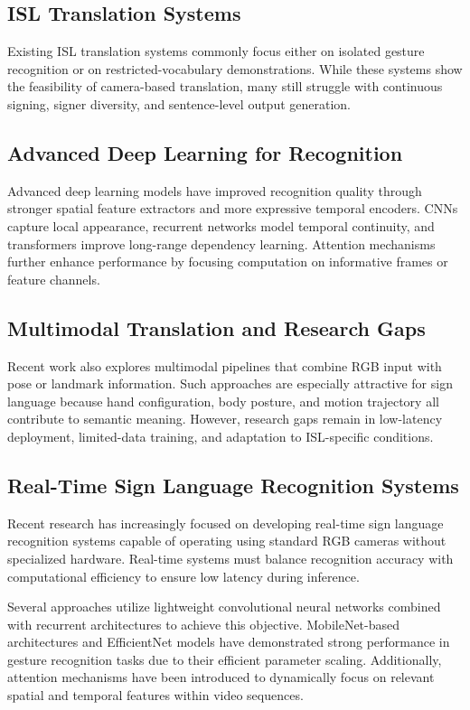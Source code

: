 \documentclass[runningheads]{llncs}
\begin{document}
\subsection{ISL Translation Systems}
Existing ISL translation systems commonly focus either on isolated gesture recognition or on restricted-vocabulary demonstrations. While these systems show the feasibility of camera-based translation, many still struggle with continuous signing, signer diversity, and sentence-level output generation.

\subsection{Advanced Deep Learning for Recognition}
Advanced deep learning models have improved recognition quality through stronger spatial feature extractors and more expressive temporal encoders. CNNs capture local appearance, recurrent networks model temporal continuity, and transformers improve long-range dependency learning. Attention mechanisms further enhance performance by focusing computation on informative frames or feature channels.

\subsection{Multimodal Translation and Research Gaps}
Recent work also explores multimodal pipelines that combine RGB input with pose or landmark information. Such approaches are especially attractive for sign language because hand configuration, body posture, and motion trajectory all contribute to semantic meaning. However, research gaps remain in low-latency deployment, limited-data training, and adaptation to ISL-specific conditions.

\subsection{Real-Time Sign Language Recognition Systems}
Recent research has increasingly focused on developing real-time sign language recognition systems capable of operating using standard RGB cameras without specialized hardware. Real-time systems must balance recognition accuracy with computational efficiency to ensure low latency during inference.

Several approaches utilize lightweight convolutional neural networks combined with recurrent architectures to achieve this objective. MobileNet-based architectures and EfficientNet models have demonstrated strong performance in gesture recognition tasks due to their efficient parameter scaling. Additionally, attention mechanisms have been introduced to dynamically focus on relevant spatial and temporal features within video sequences.
\end{document}
